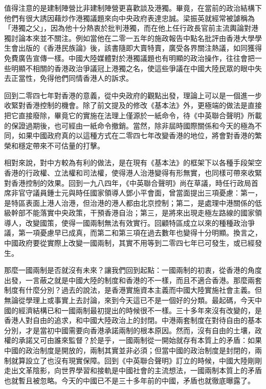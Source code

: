 值得注意的是建制陣營比非建制陣營更喜歡談及港獨。畢竟，在當前的政治結構下他們有很大誘因藉炒作港獨議題來向中央政府表達忠誠。梁振英就經常被謔稱為「港獨之父」，因為他十分熱衷於批判港獨，而在他上任行政長官前主流輿論對港獨討論本來並不關注。例如當他在二零一五年的施政報告中點名批評由香港大學學生會出版的《香港民族論》後，該書隨即大賣特賣，廣受各界關注熱議，如同獲得免費廣告宣傳一樣。中國大陸媒體對於港獨議題也有明顯的政治操作，往往會把一些明顯不相關的香港政治爭議冠上港獨之名，使這些爭議在中國大陸民眾的眼中失去正當性，免得他們同情香港人的訴求。

回到二零四七年對香港的意義，從中央政府的觀點出發，理論上可以是一個進一步收緊對香港控制的機會。除了前文提及的修改《基本法》外，更極端的做法是直接把它直接廢除，畢竟它的實施在法理上僅源於一紙命令，待《中英聯合聲明》所載的保證過期後，也可經由一紙命令撤銷。當然，除非屆時國際關係和今天的極為不同，如果中國政府真的以這種方式在二零四七年改變香港的地位，將會對香港的繁榮和穩定帶來不可估量的打擊。

相對來說，對中方較為有利的做法，是在現有《基本法》的框架下以各種手段架空香港的行政權、立法權和司法權，使得港人治港變得有形無實，也同樣可帶來收緊對香港控制的效果。回到一九八四年，《中英聯合聲明》尚在草議，時任行政局首席非官守議員鍾士元與時任國家領導人鄧小平會面，曾當面提出三項憂慮：第一，是特區表面上港人治港，但治港的港人都由北京控制；第二，是處理中港關係的低級幹部不能落實中央政策，干預香港自治；第三，是將來出現走極左路線的國家領導人，改變國策，使得一國兩制無法有效實行。回顧特區成立以來的種種政治爭議，第一項憂慮早已成真，而第二和第三項在過去數年也變得十分明顯。換言之，中國政府要從實際上改變一國兩制，其實不用等到二零四七年已可發生，或已經發生。

那麼一國兩制是否就沒有未來？讓我們回到起點：一國兩制的初衷，從香港的角度出發，一言蔽之就是中國大陸的制度和香港的不一樣，而且不適合香港。那麼兩套制度有什麼分別？過去的說法，是香港實施資本主義而中國大陸實施社會主義。但無論從學理上或事實上去討論，來到今天這已不是一個好的分類。最起碼，今天中國的經濟結構已和一國兩制最初提出的時候很不一樣。三十多年來沒有改變的，是香港人對自由的追求，和中國大陸政治上的封閉。中港兩套制度在對待自由的基本分別，才是當初中國需要向香港承諾兩制的根本原因。然而，沒有自由的土壤，政權的承諾又可由誰來監督？於是乎，一國兩制從一開始就存有本質上的矛盾：如果中國的政治制度是開放的，兩制其實並非必須；但當中國的政治制度是封閉的，兩制就算設立了也沒有現實保障。回到《中英聯合聲明》訂立的時候，中國大陸剛剛走出文革陰影，向世界學習和接軌是中國社會的主流想法，一國兩制本質上的矛盾也就暫且被忽略。今天的中國已不是三十多年前的中國，矛盾也就徹底曝露了。

